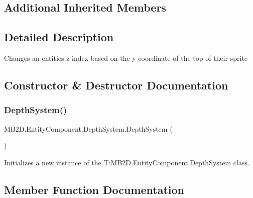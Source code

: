 \subsection*{Additional Inherited Members}


\subsection{Detailed Description}
Changes an entities z-\/index based on the y coordinate of the top of their sprite 



\subsection{Constructor \& Destructor Documentation}
\hypertarget{class_m_b2_d_1_1_entity_component_1_1_depth_system_a5a7f2fc4d65f99bb89624cbcd1d52d65}{}\label{class_m_b2_d_1_1_entity_component_1_1_depth_system_a5a7f2fc4d65f99bb89624cbcd1d52d65} 
\subsubsection{\texorpdfstring{Depth\+System()}{DepthSystem()}}
{\footnotesize\ttfamily M\+B2\+D.\+Entity\+Component.\+Depth\+System.\+Depth\+System (\begin{DoxyParamCaption}{ }\end{DoxyParamCaption})\hspace{0.3cm}{\ttfamily [inline]}}



Initializes a new instance of the T\+:\+M\+B2\+D.\+Entity\+Component.\+Depth\+System class. 



\subsection{Member Function Documentation}
\hypertarget{class_m_b2_d_1_1_entity_component_1_1_depth_system_a738556bdf819c9c0d4082a323a502c58}{}\label{class_m_b2_d_1_1_entity_component_1_1_depth_system_a738556bdf819c9c0d4082a323a502c58} 
